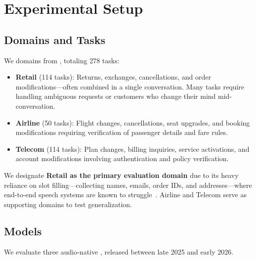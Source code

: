 \section{Experimental Setup}
\label{sec:experiments}

\subsection{Domains and Tasks}

We   domains from \tautwobench{}, totaling 278 tasks:
\begin{itemize}[nosep,leftmargin=*]
    \item \textbf{Retail} (114 tasks): Returns, exchanges, cancellations, and order modifications---often combined in a single conversation. Many tasks require handling ambiguous requests or customers who change their mind mid-conversation.
    \item \textbf{Airline} (50 tasks): Flight changes, cancellations, seat upgrades, and booking modifications requiring verification of passenger details and fare rules.
    \item \textbf{Telecom} (114 tasks): Plan changes, billing inquiries, service activations, and account modifications involving authentication and policy verification.
\end{itemize}
We designate \textbf{Retail as the primary evaluation domain} due to its heavy reliance on slot filling---collecting names, emails, order IDs, and addresses---where end-to-end speech systems are known to struggle~\citep{li_cb-whisper_2024, si_spokenwoz_2025}. Airline and Telecom serve as supporting domains to test generalization.

\subsection{Models}

We evaluate three audio-native , released between late 2025 and early 2026.  

